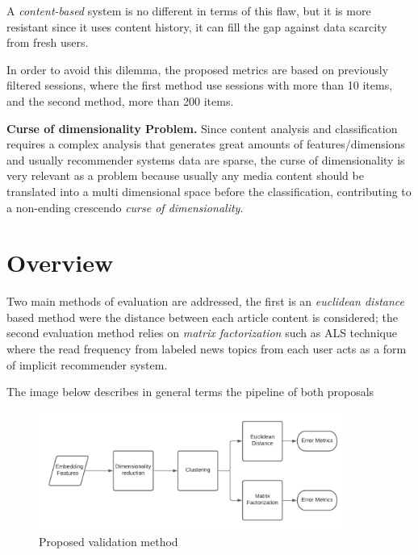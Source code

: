 \documentclass[ecp,tc,english]{iiufrgs}
\begin{document}
        A \textit{content-based} system is no different in terms of this flaw, but it is more resistant since it uses content history, it can fill the gap against data scarcity from fresh users.
        
        In order to avoid this dilemma, the proposed metrics are based on previously filtered sessions, where the first method use sessions with more than 10 items, and the second method, more than 200 items.
    
        \textbf{Curse of dimensionality Problem.} Since content analysis and classification requires a complex analysis that generates great amounts of features/dimensions and usually recommender systems data are sparse, the curse of dimensionality \cite{marimont1979} is very relevant as a problem because usually any media content should be translated into a multi dimensional space before the classification, contributing to a non-ending crescendo \textit{curse of dimensionality}.
    
    \newpage
    \section{Overview}
        Two main methods of evaluation are addressed, the first is an \textit{euclidean distance} based method were the distance between each article content is considered; the second evaluation method relies on \textit{matrix factorization} such as ALS technique \cite{takane1977} where the read frequency from labeled news topics from each user acts as a form of implicit recommender system.
        
        The image below describes in general terms the pipeline of both proposals
        
        \begin{figure}[H]
            \centering
            \includegraphics[width=0.9\textwidth]{images/experiment.png}
            \caption{Proposed validation method}
            \label{fig:method_architecture}
        \end{figure}
    
\end{document}
